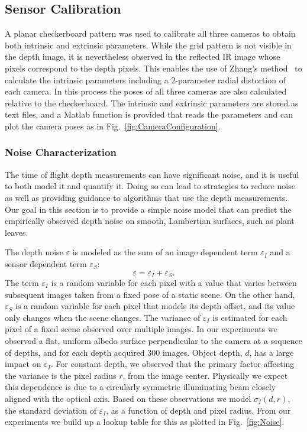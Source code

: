 

\subsection{Sensor Calibration}

A planar checkerboard pattern was used to calibrate all three cameras to obtain both intrinsic and extrinsic parameters.
While the grid pattern is not visible in the depth image, it is nevertheless observed in the reflected IR image whose pixels correspond to the depth pixels.
This enables the use of Zhang's method~\cite{Zhang2000} to calculate the intrinsic parameters including a $2$-parameter radial distortion of each camera.
In this process the poses of all three cameras are also calculated relative to the checkerboard.
The intrinsic and extrinsic parameters are stored as text files, and a Matlab function is provided that reads the parameters and can plot the camera poses as in Fig.~\ref{fig:CameraConfiguration}.


\subsubsection{Noise Characterization}
\label{sec:bias}

The time of flight depth measurements can have significant noise, and it is useful to both model it and quantify it.
Doing so can lead to strategies to reduce noise as well as providing guidance to algorithms that use the depth measurements.
Our goal in this section is to provide a simple noise model that can predict the empirically observed depth noise on smooth, Lambertian surfaces, such as plant leaves.

The depth noise $\varepsilon$ is modeled as the sum of an image dependent term $\varepsilon_I$ and a sensor dependent term $\varepsilon_S$:
\begin{equation}
\varepsilon = \varepsilon_I + \varepsilon_S. \label{eq:epsilon}
\end{equation}
The term $\varepsilon_I$ is a random variable for each pixel with a value that varies between subsequent images taken from a fixed pose of a static scene.
On the other hand, $\varepsilon_S$ is a random variable for each pixel that models its depth offset, and its value only changes when the scene changes.
The variance of $\varepsilon_I$ is estimated for each pixel of a fixed scene observed over multiple images.
In our experiments we observed a flat, uniform albedo surface perpendicular to the camera at a sequence of depths, and for each depth acquired $300$ images.
Object depth, $d$, has a large impact on $\varepsilon_I$.
For constant depth, we observed that the primary factor affecting the variance is the pixel radius $r$, from the image center.
Physically we expect this dependence is due to a circularly symmetric illuminating beam closely aligned with the optical axis.
Based on these observations we model $\sigma_I(d,r)$, the standard deviation of $\varepsilon_I$, as a function of depth and pixel radius.
From our experiments we build up a lookup table for this as plotted in Fig.~\ref{fig:Noise}.

